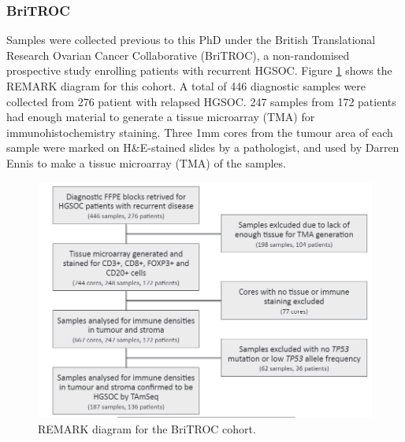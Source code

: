 \subsubsection{BriTROC} Samples were collected previous to this PhD under the British Translational Research Ovarian Cancer Collaborative (BriTROC), a non-randomised prospective study enrolling patients with recurrent HGSOC\cite{}.  Figure \ref{fig:BriTROC_remark} shows the REMARK diagram for this cohort. A total of 446 diagnostic samples were collected from 276 patient with relapsed HGSOC. 247 samples from 172 patients had enough material to generate a tissue microarray (TMA) for immunohistochemistry staining. Three 1mm cores from the tumour area of each sample were marked on H&E-stained slides by a pathologist, and used by Darren Ennis to make a tissue microarray (TMA) of the samples.
\begin{figure}
    \centering
    \includegraphics{Chapter4/figs/remark_britroc.png}
    \caption{REMARK diagram for the BriTROC cohort.}
    \label{fig:BriTROC_remark}
\end{figure}


